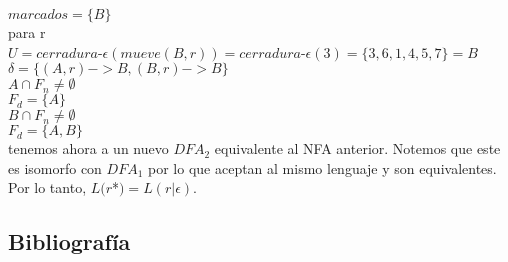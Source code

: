 \documentclass{article}
\newcommand{\set}[1]{\{ #1  \}}
\newcommand{\cerradura}[1]{cerradura$-$\epsilon(#1) }
\begin{document}
\begin{spacing}{1.1}
\indent $marcados = \set{B}$\\
\indent \indent para r\\
\indent \indent \indent $U = \cerradura{mueve(B,r)} = \cerradura{3} = \set{3,6,1,4,5,7} = B$\\
\indent \indent \indent $\delta = \set{(A,r) -> B, (B,r) -> B}$\\

$A \cap F_n \neq \emptyset$ \\
\indent $F_d = \set{A}$\\
$B \cap F_n \neq \emptyset$ \\
\indent $F_d = \set{A,B}$\\

tenemos ahora a un nuevo $DFA_2$ equivalente al NFA anterior. Notemos que este es isomorfo con $DFA_1$ por lo que aceptan al mismo lenguaje y son equivalentes. Por lo tanto, $L(r$*$) = L(r|\epsilon)$.

\begin{center}
\end{center}



 
\subsection{Bibliograf\'{i}a}


\end{spacing}
\end{document}
